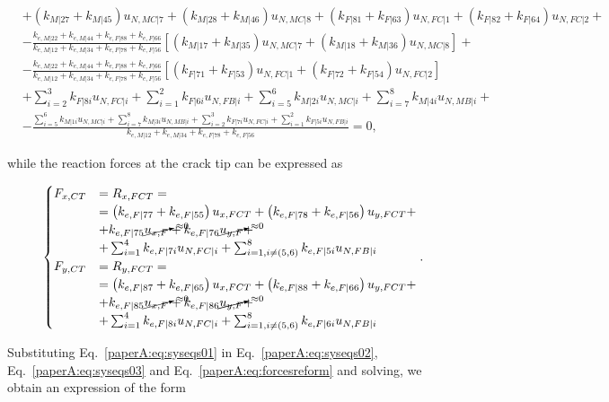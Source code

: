 \begin{equation}
\begin{split}
&+\left(k_{M|27}+k_{M|45}\right)u_{N,MC|7}+\left(k_{M|28}+k_{M|46}\right)u_{N,MC|8}+\left(k_{F|81}+k_{F|63}\right)u_{N,FC|1}+\left(k_{F|82}+k_{F|64}\right)u_{N,FC|2}+\\
&-\frac{k_{e,M|22}+k_{e,M|44}+k_{e,F|88}+k_{e,F|66}}{k_{e,M|12}+k_{e,M|34}+k_{e,F|78}+k_{e,F|56}}\left[\left(k_{M|17}+k_{M|35}\right)u_{N,MC|7}+\left(k_{M|18}+k_{M|36}\right)u_{N,MC|8}\right]+\\&
-\frac{k_{e,M|22}+k_{e,M|44}+k_{e,F|88}+k_{e,F|66}}{k_{e,M|12}+k_{e,M|34}+k_{e,F|78}+k_{e,F|56}}\left[\left(k_{F|71}+k_{F|53}\right)u_{N,FC|1}+\left(k_{F|72}+k_{F|54}\right)u_{N,FC|2}\right]\\
&+\sum_{i=2}^{3}k_{F|8i}u_{N,FC|i}+\sum_{i=1}^{2}k_{F|6i}u_{N,FB|i}+\sum_{i=5}^{6}k_{M|2i}u_{N,MC|i}+\sum_{i=7}^{8}k_{M|4i}u_{N,MB|i}+\\
&-\frac{\sum_{i=5}^{6}k_{M|1i}u_{N,MC|i}+\sum_{i=7}^{8}k_{M|3i}u_{N,MB|i}+\sum_{i=2}^{3}k_{F|7i}u_{N,FC|i}+\sum_{i=1}^{2}k_{F|5i}u_{N,FB|i}}{k_{e,M|12}+k_{e,M|34}+k_{e,F|78}+k_{e,F|56}}=0,
\end{split}
\end{equation}

while the reaction forces at the crack tip can be expressed as

\begin{equation}\label{paperA:eq:forcesreform}
\begin{cases}
F_{x,CT}&=R_{x,FCT}=\\&=\left(k_{e,F|77}+k_{e,F|55}\right)u_{x,FCT}+\left(k_{e,F|78}+k_{e,F|56}\right)u_{y,FCT}+\\
&+k_{e,F|75}\cancelto{\approx 0}{u_{x,F}}+k_{e,F|76}\cancelto{\approx 0}{u_{y,F}}+\\
&+\sum_{i=1}^{4}k_{e,F|7i}u_{N,FC|i}+\sum_{i=1,i\neq\left(5,6\right)}^{8}k_{e,F|5i}u_{N,FB|i}\\
F_{y,CT}&=R_{y,FCT}=\\&=\left(k_{e,F|87}+k_{e,F|65}\right)u_{x,FCT}+\left(k_{e,F|88}+k_{e,F|66}\right)u_{y,FCT}+\\
&+k_{e,F|85}\cancelto{\approx 0}{u_{x,F}}+k_{e,F|86}\cancelto{\approx 0}{u_{y,F}}+\\
&+\sum_{i=1}^{4}k_{e,F|8i}u_{N,FC|i}+\sum_{i=1,i\neq\left(5,6\right)}^{8}k_{e,F|6i}u_{N,FB|i}\\
\end{cases}.
\end{equation}

Substituting Eq.~\ref{paperA:eq:syseqs01} in Eq.~\ref{paperA:eq:syseqs02}, Eq.~\ref{paperA:eq:syseqs03} and Eq.~\ref{paperA:eq:forcesreform} and solving, we obtain an expression of the form

